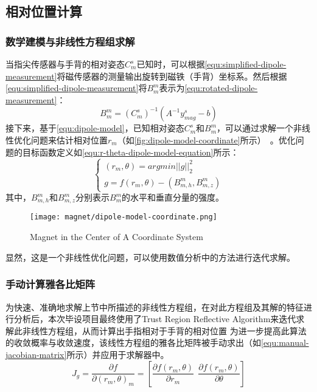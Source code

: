 \subsection{相对位置计算}
\subsubsection{数学建模与非线性方程组求解}
当指尖传感器与手背的相对姿态$C_m^s$已知时，可以根据\autoref{equ:simplified-dipole-measurement}将磁传感器的测量输出旋转到磁铁（手背）坐标系。然后根据\autoref{equ:simplified-dipole-measurement}将$B_m^m$表示为\autoref{equ:rotated-dipole-measurement}：
\begin{equation}
    \label{equ:rotated-dipole-measurement}
    B_m^m = (C_m^s)^{-1}(A^{-1}y_{mag}^s - b)
\end{equation}
接下来，基于\autoref{equ:dipole-model}，已知相对姿态$C^s_m$和$B_m^m$，可以通过求解一个非线性优化问题来估计相对位置$r_m$（如\autoref{fig:dipole-model-coordinate}所示）~\cite{mainArticle2}。优化问题的目标函数定义如\autoref{equ:r-theta-dipole-model-equation}所示：
\begin{equation}
    \label{equ:r-theta-dipole-model-equation}
    \begin{cases}
        (r_m, \theta) = argmin{||g||}_2^2 \\
        g = f(r_m, \theta) - (B_{m,h}^m,B_{m,z}^m)
    \end{cases}
\end{equation}
其中，$B_{m,h}^m$和$B_{m,z}^m$分别表示$B_m^m$的水平和垂直分量的强度。

\begin{figure}[H]
    \centering
    \texttt{[image: magnet/dipole-model-coordinate.png]}
    \caption{\label{fig:dipole-model-coordinate}Magnet in the Center of A Coordinate System}
\end{figure}

显然，这是一个非线性优化问题，可以使用数值分析中的方法进行迭代求解。
\subsubsection{手动计算雅各比矩阵}
为快速、准确地求解上节中所描述的非线性方程组，在对此方程组及其解的特征进行分析后，本次毕设项目最终使用了Trust Region Reflective Algorithm来迭代求解此非线性方程组，从而计算出手指相对于手背的相对位置
为进一步提高此算法的收敛概率与收敛速度，该线性方程组的雅各比矩阵被手动求出（如\autoref{equ:manual-jacobian-matrix}所示）并应用于求解器中。
\begin{equation}
    \label{equ:manual-jacobian-matrix}
    J_g = \frac{\partial{f}}{\partial{{(r_m, \theta)}_m}} = [\frac{\partial{f(r_m,\theta)}}{\partial{r_m}}\ \ \frac{\partial{f(r_m,\theta)}}{\partial{\theta}}]
\end{equation}

